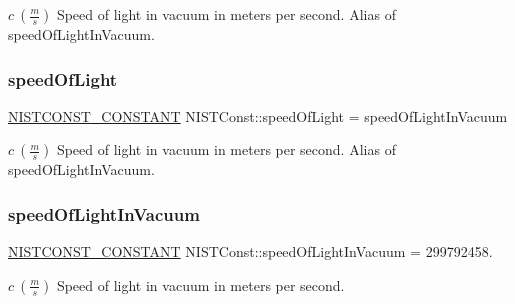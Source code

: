 $c \ (\frac{m}{s})$ Speed of light in vacuum in meters per second. Alias of speed\+Of\+Light\+In\+Vacuum. \mbox{\label{group___n_i_s_t_const-_speed_of_light_ga44583a4eba890815ba1833de360a2292}} 
\subsubsection{\texorpdfstring{speed\+Of\+Light}{speedOfLight}}
{\footnotesize\ttfamily \mbox{\hyperlink{group___n_i_s_t_const-_macros_ga2b0fc1d7452373f816175dd86ce26729}{N\+I\+S\+T\+C\+O\+N\+S\+T\+\_\+\+C\+O\+N\+S\+T\+A\+NT}} N\+I\+S\+T\+Const\+::speed\+Of\+Light = speed\+Of\+Light\+In\+Vacuum}

$c \ (\frac{m}{s})$ Speed of light in vacuum in meters per second. Alias of speed\+Of\+Light\+In\+Vacuum. \mbox{\label{group___n_i_s_t_const-_speed_of_light_ga5b7c240e787216aab4b730470074888e}} 
\subsubsection{\texorpdfstring{speed\+Of\+Light\+In\+Vacuum}{speedOfLightInVacuum}}
{\footnotesize\ttfamily \mbox{\hyperlink{group___n_i_s_t_const-_macros_ga2b0fc1d7452373f816175dd86ce26729}{N\+I\+S\+T\+C\+O\+N\+S\+T\+\_\+\+C\+O\+N\+S\+T\+A\+NT}} N\+I\+S\+T\+Const\+::speed\+Of\+Light\+In\+Vacuum = 299792458.}

$c \ (\frac{m}{s})$ Speed of light in vacuum in meters per second. 